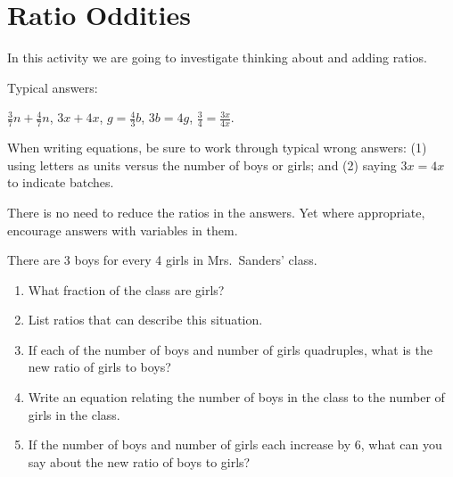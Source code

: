 \newpage
\section{Ratio Oddities}\label{A:ratioOddities}
In this activity we are going to investigate thinking about and adding
ratios.

\begin{teachingnote}
Typical answers:
  
\begin{center}
$\frac{3}{7}n+\frac{4}{7}n$, $3x+4x$, $g=\frac{4}{3}b$, $3b=4g$, $\frac{3}{4} = \frac{3x}{4x}$.
\end{center}

When writing equations, be sure to work through typical wrong answers:  (1) using letters as units versus the number of boys or girls; and (2) saying $3x=4x$ to indicate batches.  

There is no need to reduce the ratios in the answers.  Yet where appropriate, encourage answers with variables in them.

\end{teachingnote}

\begin{prob}
There are 3 boys for every 4 girls in Mrs.\ Sanders' class.
\begin{enumerate}
\item What fraction of the class are girls? 
\item List ratios that can describe this situation. 
\item If each of the number of boys and number of girls quadruples, what is the new ratio of girls to boys?
\item Write an equation relating the number of boys in the class to the number of girls in the class.

\item If the number of boys and number of girls each increase by 6, what can you say about the new ratio of boys to girls?
\end{enumerate}
\end{prob}



